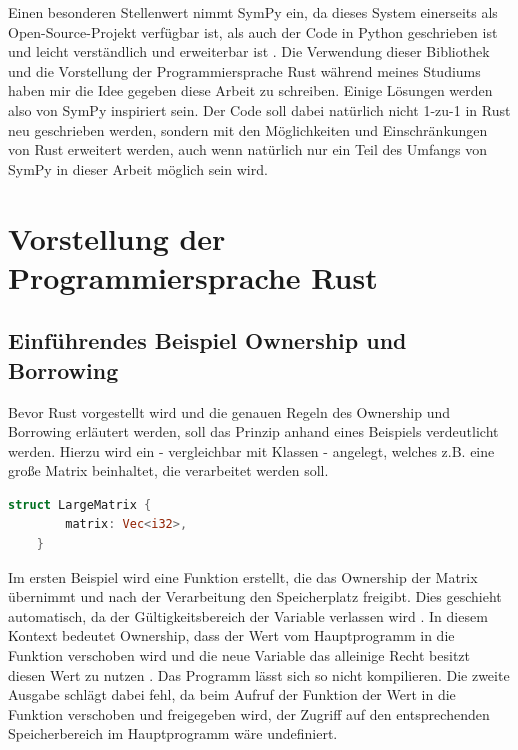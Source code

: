 \documentclass[11pt,a4paper, ngerman]{article}
\begin{document}
Einen besonderen Stellenwert nimmt SymPy ein, da dieses System einerseits als Open-Source-Projekt verfügbar ist, als auch der Code in Python geschrieben ist und leicht verständlich und erweiterbar ist \cite[S. 1]{SympyPeerJ}. Die Verwendung dieser Bibliothek und die Vorstellung der Programmiersprache Rust während meines Studiums haben mir die Idee gegeben diese Arbeit zu schreiben. Einige Lösungen werden also von SymPy inspiriert sein. Der Code soll dabei natürlich nicht 1-zu-1 in Rust neu geschrieben werden, sondern mit den Möglichkeiten und Einschränkungen von Rust erweitert werden, auch wenn natürlich nur ein Teil des Umfangs von SymPy in dieser Arbeit möglich sein wird.

\newpage

\section{Vorstellung der Programmiersprache Rust}
\subsection{Einführendes Beispiel Ownership und Borrowing}
Bevor Rust vorgestellt wird und die genauen Regeln des Ownership und Borrowing erläutert werden, soll das Prinzip anhand eines Beispiels verdeutlicht werden. Hierzu wird ein  - vergleichbar mit Klassen - angelegt, welches z.B. eine große Matrix beinhaltet, die verarbeitet werden soll.

\begin{lstlisting}[language=rust, caption={Einführendes Beispiel struct}]
    struct LargeMatrix {
        matrix: Vec<i32>,
    }
\end{lstlisting}

 Im ersten Beispiel wird eine Funktion erstellt, die das Ownership der Matrix übernimmt und nach der Verarbeitung den Speicherplatz freigibt. Dies geschieht automatisch, da der Gültigkeitsbereich der Variable  verlassen wird \cite{RustOwnershipFreed}. In diesem Kontext bedeutet Ownership, dass der Wert vom Hauptprogramm in die Funktion verschoben wird und die neue Variable  das alleinige Recht besitzt diesen Wert zu nutzen \cite{RustMovingTerm}. Das Programm lässt sich so nicht kompilieren. Die zweite Ausgabe schlägt dabei fehl, da beim Aufruf der Funktion der Wert in die Funktion verschoben und freigegeben wird, der Zugriff auf den entsprechenden Speicherbereich im Hauptprogramm wäre undefiniert.
\end{document}
